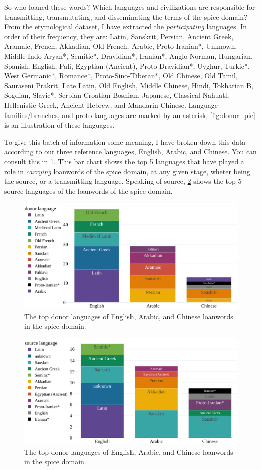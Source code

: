So who loaned these words? Which languages and civilizations are responsible for transmitting, transmutating, and disseminating the terms of the spice domain? From the etymological dataset, I have extracted the \textit{participating} languages. In order of their frequency, they are: Latin, Sanskrit, Persian, Ancient Greek, Aramaic, French, Akkadian, Old French, Arabic, Proto-Iranian*, Unknown, Middle Indo-Aryan*, Semitic*, Dravidian*, Iranian*, Anglo-Norman, Hungarian, Spanish, English, Pali, Egyptian (Ancient), Proto-Dravidian*, Uyghur, Turkic*, West Germanic*, Romance*, Proto-Sino-Tibetan*, Old Chinese, Old Tamil, Sauraseni Prakrit, Late Latin, Old English, Middle Chinese, Hindi, Tokharian B, Sogdian, Slavic*, Serbian-Croatian-Bosnian, Japanese, Classical Nahuatl, Hellenistic Greek, Ancient Hebrew, and Mandarin Chinese. Language families/branches, and proto languages are marked by an asterisk, \cref{fig:donor_pie} is an illustration of these languages.

To give this batch of information some meaning, I have broken down this data according to our three reference languages, English, Arabic, and Chinese. You can consult this in \cref{fig:donor_bar}. This bar chart shows the top 5 languages that have played a role in \textit{carrying} loanwords of the spice domain, at any given stage, wheter being the source, or a transmitting language. Speaking of source, \cref{fig:source_bar} shows the top 5 source languages of the loanwords of the spice domain.

\begin{figure}[!ht]
  \centering
  \includegraphics[width=\linewidth]{imgs/plots/donor_bar.pdf}
  \caption{The top donor languages of English, Arabic, and Chinese loanwords in the spice domain.}
  \label{fig:donor_bar}
\end{figure}

\begin{figure}[!ht]
  \centering
  \includegraphics[width=\linewidth]{imgs/plots/source_bar.pdf}
  \caption{The top donor languages of English, Arabic, and Chinese loanwords in the spice domain.}
  \label{fig:source_bar}
\end{figure}








